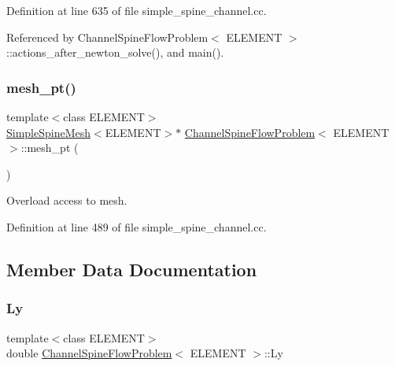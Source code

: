 Definition at line 635 of file simple\+\_\+spine\+\_\+channel.\+cc.



Referenced by Channel\+Spine\+Flow\+Problem$<$ E\+L\+E\+M\+E\+N\+T $>$\+::actions\+\_\+after\+\_\+newton\+\_\+solve(), and main().

\mbox{\label{classChannelSpineFlowProblem_ab68c7ab5406b90a0ef56c39b67f83a09}} 
\subsubsection{\texorpdfstring{mesh\+\_\+pt()}{mesh\_pt()}}
{\footnotesize\ttfamily template$<$class E\+L\+E\+M\+E\+NT$>$ \\
\hyperlink{classSimpleSpineMesh}{Simple\+Spine\+Mesh}$<$E\+L\+E\+M\+E\+NT$>$$\ast$ \hyperlink{classChannelSpineFlowProblem}{Channel\+Spine\+Flow\+Problem}$<$ E\+L\+E\+M\+E\+NT $>$\+::mesh\+\_\+pt (\begin{DoxyParamCaption}{ }\end{DoxyParamCaption})\hspace{0.3cm}{\ttfamily [inline]}}



Overload access to mesh. 



Definition at line 489 of file simple\+\_\+spine\+\_\+channel.\+cc.



\subsection{Member Data Documentation}
\mbox{\label{classChannelSpineFlowProblem_a6ac51c3c9d400869e694fe00452e293f}} 
\subsubsection{\texorpdfstring{Ly}{Ly}}
{\footnotesize\ttfamily template$<$class E\+L\+E\+M\+E\+NT$>$ \\
double \hyperlink{classChannelSpineFlowProblem}{Channel\+Spine\+Flow\+Problem}$<$ E\+L\+E\+M\+E\+NT $>$\+::Ly\hspace{0.3cm}{\ttfamily [private]}}




